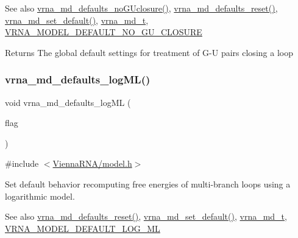 \begin{DoxySeeAlso}{See also}
\mbox{\hyperlink{group__model__details_gade5b9951d71ca2fb357a4e6c0c18ccd1}{vrna\+\_\+md\+\_\+defaults\+\_\+no\+G\+Uclosure()}}, \mbox{\hyperlink{group__model__details_ga70834424cf804d149937de89f80ceb45}{vrna\+\_\+md\+\_\+defaults\+\_\+reset()}}, \mbox{\hyperlink{group__model__details_ga8ac6ff84936282436f822644bf841f66}{vrna\+\_\+md\+\_\+set\+\_\+default()}}, \mbox{\hyperlink{group__model__details_ga1f8a10e12a0a1915f2a4eff0b28ea17c}{vrna\+\_\+md\+\_\+t}}, \mbox{\hyperlink{group__model__details_ga5308de46faaca4b9fd16045864901ee7}{V\+R\+N\+A\+\_\+\+M\+O\+D\+E\+L\+\_\+\+D\+E\+F\+A\+U\+L\+T\+\_\+\+N\+O\+\_\+\+G\+U\+\_\+\+C\+L\+O\+S\+U\+RE}} 
\end{DoxySeeAlso}
\begin{DoxyReturn}{Returns}
The global default settings for treatment of G-\/U pairs closing a loop 
\end{DoxyReturn}
\mbox{\label{group__model__details_ga3de50a73455d88c3957386933b8e1f90}} 
\subsubsection{\texorpdfstring{vrna\+\_\+md\+\_\+defaults\+\_\+log\+M\+L()}{vrna\_md\_defaults\_logML()}}
{\footnotesize\ttfamily void vrna\+\_\+md\+\_\+defaults\+\_\+log\+ML (\begin{DoxyParamCaption}\item[{int}]{flag }\end{DoxyParamCaption})}



{\ttfamily \#include $<$\mbox{\hyperlink{model_8h}{Vienna\+R\+N\+A/model.\+h}}$>$}



Set default behavior recomputing free energies of multi-\/branch loops using a logarithmic model. 

\begin{DoxySeeAlso}{See also}
\mbox{\hyperlink{group__model__details_ga70834424cf804d149937de89f80ceb45}{vrna\+\_\+md\+\_\+defaults\+\_\+reset()}}, \mbox{\hyperlink{group__model__details_ga8ac6ff84936282436f822644bf841f66}{vrna\+\_\+md\+\_\+set\+\_\+default()}}, \mbox{\hyperlink{group__model__details_ga1f8a10e12a0a1915f2a4eff0b28ea17c}{vrna\+\_\+md\+\_\+t}}, \mbox{\hyperlink{group__model__details_ga938f68463e84fe060aa6502f428a517d}{V\+R\+N\+A\+\_\+\+M\+O\+D\+E\+L\+\_\+\+D\+E\+F\+A\+U\+L\+T\+\_\+\+L\+O\+G\+\_\+\+ML}} 
\end{DoxySeeAlso}

